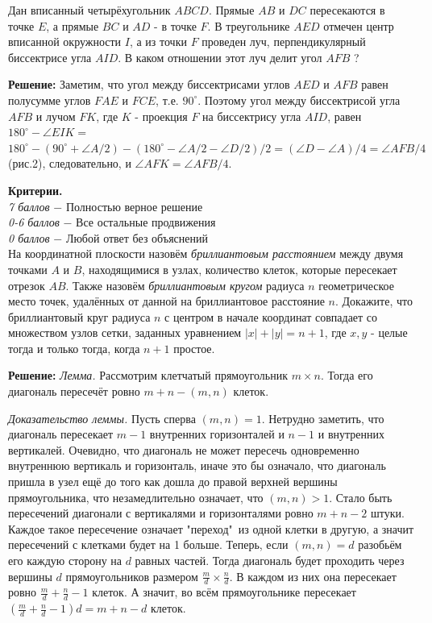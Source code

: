 Дан вписанный четырёхугольник $A B C D$. Прямые $A B$ и $D C$ пересекаются в точке $E$, а прямые $B C$ и $A D$ - в точке $F$. В треугольнике $A E D$ отмечен центр вписанной окружности $I$, а из точки $F$ проведен луч, перпендикулярный биссектрисе угла $A I D$. В каком отношении этот луч делит угол $A F B$ ?

\textbf{Решение:} Заметим, что угол между биссектрисами углов $A E D$ и $A F B$ равен полусумме углов $F A E$ и $F C E$, т.е. $90^{\circ}$. Поэтому угол между биссектрисой угла $A F B$ и лучом $F K$, где $K$ - проекция $F$ на биссектрису угла $A I D$, равен $180^{\circ}-\angle E I K=$ $180^{\circ}-\left(90^{\circ}+\angle A / 2\right)-\left(180^{\circ}-\angle A / 2-\angle D / 2\right) / 2=(\angle D-\angle A) / 4=\angle A F B / 4$ (рис.2), следовательно, и $\angle A F K=\angle A F B / 4$.

\textbf{Критерии.} \\
\textit{7 баллов} $-$ Полностью верное решение\\
\textit{0-6 баллов} $-$ Все остальные продвижения\\
\textit{0 баллов} $-$ Любой ответ без объяснений\\

На координатной плоскости назовём \textit{бриллиантовым расстоянием} между двумя точками $A$ и $B$, находящимися в узлах, количество клеток, которые пересекает отрезок $AB$. Также назовём \textit{бриллиантовым кругом} радиуса $n$ геометрическое место точек, удалённых от данной на бриллиантовое расстояние $n$. Докажите, что бриллиантовый круг радиуса $n$ с центром в начале координат совпадает со множеством узлов сетки, заданных уравнением $|x| + |y| = n+1$, где $x,y$ - целые тогда и только тогда, когда $n+1$ простое.

\textbf{Решение:}  \textit{Лемма.}
    Рассмотрим клетчатый прямоугольник $m \times n$. Тогда его диагональ пересечёт ровно $m+n - (m, n)$ клеток.
    
    \textit{Доказательство леммы.} Пусть сперва $(m, n) = 1$. Нетрудно заметить, что диагональ пересекает $m - 1$ внутренних горизонталей и $n - 1$ и внутренних вертикалей. Очевидно, что диагональ не может пересечь одновременно внутреннюю вертикаль и горизонталь, иначе это бы означало, что диагональ пришла в узел ещё до того как дошла до правой верхней вершины прямоугольника, что незамедлительно означает, что $(m, n)>1$. Стало быть пересечений диагонали с вертикалями и горизонталями ровно $m+n-2$ штуки. Каждое такое пересечение означает "переход"\, из одной клетки в другую, а значит пересечений с клетками будет на 1 больше. Теперь, если $(m, n) = d$ разобьём его каждую сторону на $d$ равных частей. Тогда диагональ будет проходить через вершины $d$ прямоугольников размером $\frac{m}{d} \times \frac{n}{d}$. В каждом из них она пересекает ровно $\frac{m}{d} + \frac{n}{d} - 1$ клеток. А значит, во всём прямоугольнике пересекает $(\frac{m}{d} + \frac{n}{d} - 1)d = m + n - d$ клеток.

